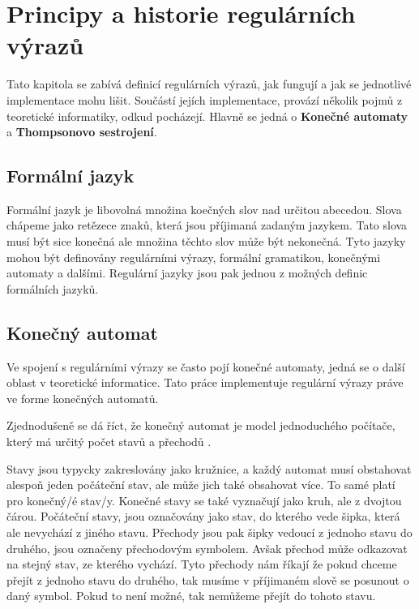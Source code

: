 \chapter{Principy a historie regulárních výrazů}\label{sec:Principle}

Tato kapitola se zabívá definicí regulárních výrazů, jak fungují a jak se jednotlivé implementace mohu lišit. 
Součástí jejích implementace, provází několik pojmů z teoretické informatiky, odkud pocházejí.
Hlavně se jedná o \textbf{Konečné automaty} a \textbf{Thompsonovo sestrojení}.




\section{Formální jazyk}
Formální jazyk je libovolná množina koečných slov nad určitou abecedou. 
Slova chápeme jako retězece znaků, která jsou příjimaná zadaným jazykem.
Tato slova musí být sice konečná ale množina těchto slov může být nekonečná. 
Tyto jazyky mohou být definovány regulárními výrazy, formální gramatikou,
konečnými automaty a dalšími. Regulární jazyky jsou pak jednou z možných definic formálních jazyků.

\section{Konečný automat}\label{sec:FiniteAutomaton}
Ve spojení s regulárními výrazy se často pojí konečné automaty, jedná se o další oblast v teoretické informatice.
Tato práce implementuje regulární výrazy práve ve forme konečných automatů.

Zjednodušeně se dá říct, že konečný automat je model jednoduchého počítače, který má určitý počet stavů a přechodů \cite{Havrlant}. 

Stavy jsou typycky zakreslovány jako kružnice, a každý automat musí obstahovat alespoň jeden počáteční stav, ale může jich také obsahovat více. 
To samé platí pro konečný/é stav/y. 
Konečné stavy se také vyznačují jako kruh, ale z dvojtou čárou. 
Počáteční stavy, jsou označovány jako stav, do kterého vede šipka, která ale nevychází z jiného stavu.
Přechody jsou pak šipky vedoucí z jednoho stavu do druhého, jsou označeny přechodovým symbolem.
Avšak přechod může odkazovat na stejný stav, ze kterého vychází.
Tyto přechody nám říkají že pokud chceme přejít z jednoho stavu do druhého, tak musíme v příjimaném slově se posunout o daný symbol. 
Pokud to není možné, tak nemůžeme přejít do tohoto stavu.

